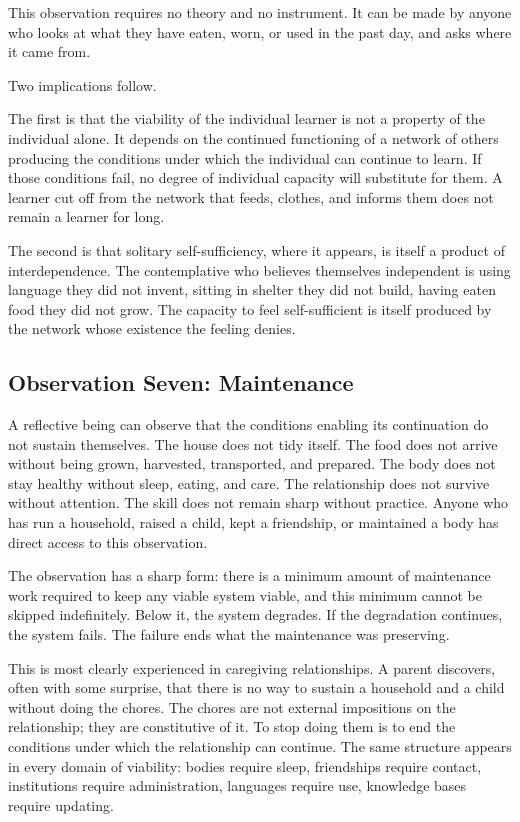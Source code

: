 \documentclass[11pt]{article}
\begin{document}
This observation requires no theory and no instrument. It can be made 
by anyone who looks at what they have eaten, worn, or used in the past 
day, and asks where it came from.

Two implications follow.

The first is that the viability of the individual learner is not a 
property of the individual alone. It depends on the continued 
functioning of a network of others producing the conditions under 
which the individual can continue to learn. If those conditions fail, 
no degree of individual capacity will substitute for them. A learner 
cut off from the network that feeds, clothes, and informs them does 
not remain a learner for long.

The second is that solitary self-sufficiency, where it appears, is 
itself a product of interdependence. The contemplative who believes 
themselves independent is using language they did not invent, sitting 
in shelter they did not build, having eaten food they did not grow. 
The capacity to feel self-sufficient is itself produced by the network 
whose existence the feeling denies.

\subsection{Observation Seven: Maintenance}

A reflective being can observe that the conditions enabling its 
continuation do not sustain themselves. The house does not tidy itself. 
The food does not arrive without being grown, harvested, transported, 
and prepared. The body does not stay healthy without sleep, eating, 
and care. The relationship does not survive without attention. The 
skill does not remain sharp without practice. Anyone who has run a 
household, raised a child, kept a friendship, or maintained a body has 
direct access to this observation.

The observation has a sharp form: there is a minimum amount of 
maintenance work required to keep any viable system viable, and this 
minimum cannot be skipped indefinitely. Below it, the system degrades. 
If the degradation continues, the system fails. The failure ends what 
the maintenance was preserving.

This is most clearly experienced in caregiving relationships. A parent 
discovers, often with some surprise, that there is no way to sustain 
a household and a child without doing the chores. The chores are not 
external impositions on the relationship; they are constitutive of it. 
To stop doing them is to end the conditions under which the relationship 
can continue. The same structure appears in every domain of viability: 
bodies require sleep, friendships require contact, institutions require 
administration, languages require use, knowledge bases require updating.
\end{document}
